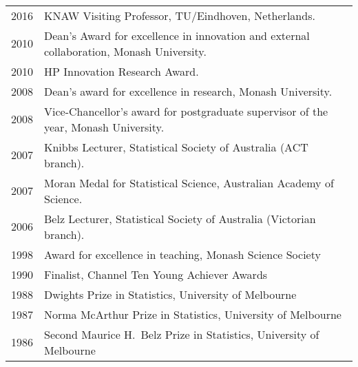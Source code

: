 \documentclass[a4paper,10pt]{article}
\begin{document}
~\begin{tabular}{ll}
2016 & KNAW Visiting Professor, TU/Eindhoven, Netherlands.\\
2010 & Dean's Award for excellence in innovation and external collaboration, Monash University.\\
2010 & HP Innovation Research Award.\\
2008 & Dean's award for excellence in research, Monash University.\\
2008 & Vice-Chancellor's award for postgraduate supervisor of the year, Monash University.\\
2007 & Knibbs Lecturer, Statistical Society of Australia (ACT branch).\\
2007 & Moran Medal for Statistical Science, Australian Academy of Science.\\
2006 & Belz Lecturer, Statistical Society of Australia (Victorian branch).\\
1998 & Award for excellence in teaching, Monash Science Society\\
1990 & Finalist, Channel Ten Young Achiever Awards\\
1988 & Dwights Prize in Statistics, University of Melbourne\\
1987 & Norma McArthur Prize in Statistics, University of Melbourne\\
1986 & Second Maurice H.\ Belz Prize in Statistics, University of Melbourne
\end{tabular}
\end{document}
